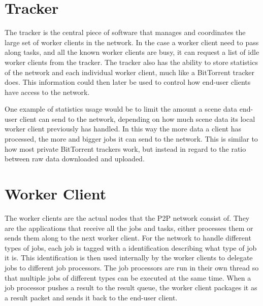 \section{Tracker}
The tracker is the central piece of software that manages and coordinates the large set of worker clients in the network.
In the case a worker client need to pass along tasks, and all the known worker clients are busy, it can request a list of idle worker clients from the tracker. The tracker also has the ability to store statistics of the network and each individual worker client, much like a BitTorrent tracker does. This information could then later be used to control how end-user clients have access to the network. 

One example of statistics usage would be to limit the amount a scene data end-user client can send to the network, depending on how much scene data its local worker client previously has handled. In this way the more data a client has processed, the more and bigger jobs it can send to the network. This is similar to how most private BitTorrent trackers work, but instead in regard to the ratio between raw data downloaded and uploaded.



\section{Worker Client}
The worker clients are the actual nodes that the P2P network consist of. They are the applications that receive all the jobs and tasks, either processes them or sends them along to the next worker client. For the network to handle different types of jobs, each job is tagged with a identification describing what type of job it is. This identification is then used internally by the worker clients to delegate jobs to different job processors. The job processors are run in their own thread so that multiple jobs of different types can be executed at the same time. When a job processor pushes a result to the result queue, the worker client packages it as a result packet and sends it back to the end-user client.

